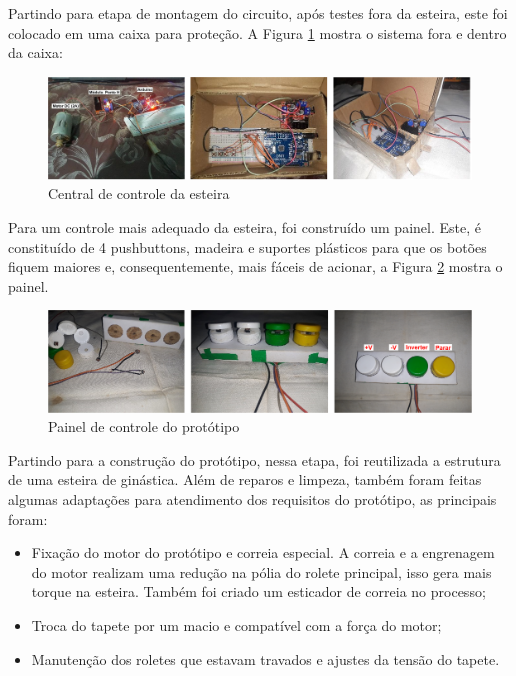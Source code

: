     Partindo para etapa de montagem do circuito, após testes fora da esteira, este foi colocado em uma caixa para proteção. A Figura \ref{fig:CentralDeControleEsteira} mostra o sistema fora e dentro da caixa:
    
        \begin{figure}[h]
           \centering
           \includegraphics[width=1\textwidth]{imagens/CentralDeControleEsteira.png}
           \caption{Central de controle da esteira}
          \label{fig:CentralDeControleEsteira}
        \end{figure}
    
    Para um controle mais adequado da esteira, foi construído um painel. Este, é constituído de 4 pushbuttons, madeira e suportes plásticos para que os botões fiquem maiores e, consequentemente, mais fáceis de acionar, a Figura \ref{fig:PainelDeControlePrototipo} mostra o painel.
    
        \begin{figure}[h]
           \centering
           \includegraphics[width=1\textwidth]{imagens/PainelDeControlePrototipo.png}
           \caption{Painel de controle do protótipo}
          \label{fig:PainelDeControlePrototipo}
        \end{figure}
    
    





    Partindo para a construção do protótipo, nessa etapa, foi reutilizada a estrutura de uma esteira de ginástica. Além de reparos e limpeza, também foram feitas algumas adaptações para atendimento dos requisitos do protótipo, as principais foram:
    
    \begin{itemize}
        \item Fixação do motor do protótipo e correia especial. A correia e a engrenagem do motor realizam uma redução na pólia do rolete principal, isso gera mais torque na esteira. Também foi criado um esticador de correia no processo;
        \item Troca do tapete por um macio e compatível com a força do motor;
        \item Manutenção dos roletes que estavam travados e ajustes da tensão do tapete.
    \end{itemize}
    

